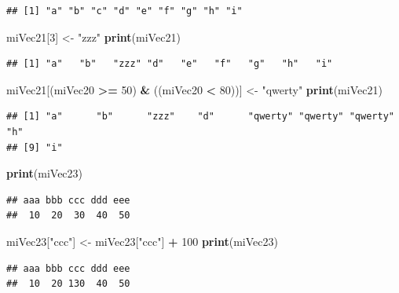 \documentclass[
]{book}
\newenvironment{Shaded}{\begin{snugshade}}{\end{snugshade}}
\newcommand{\DecValTok}[1]{\textcolor[rgb]{0.00,0.00,0.81}{#1}}
\newcommand{\KeywordTok}[1]{\textcolor[rgb]{0.13,0.29,0.53}{\textbf{#1}}}
\newcommand{\NormalTok}[1]{#1}
\newcommand{\OperatorTok}[1]{\textcolor[rgb]{0.81,0.36,0.00}{\textbf{#1}}}
\newcommand{\StringTok}[1]{\textcolor[rgb]{0.31,0.60,0.02}{#1}}
\begin{document}
\begin{verbatim}
## [1] "a" "b" "c" "d" "e" "f" "g" "h" "i"
\end{verbatim}

\begin{Shaded}
\begin{Highlighting}[]
\NormalTok{miVec21[}\DecValTok{3}\NormalTok{] <-}\StringTok{ "zzz"}
\KeywordTok{print}\NormalTok{(miVec21)}
\end{Highlighting}
\end{Shaded}

\begin{verbatim}
## [1] "a"   "b"   "zzz" "d"   "e"   "f"   "g"   "h"   "i"
\end{verbatim}

\begin{Shaded}
\begin{Highlighting}[]
\NormalTok{miVec21[(miVec20 }\OperatorTok{>=}\StringTok{ }\DecValTok{50}\NormalTok{) }\OperatorTok{&}\StringTok{ }\NormalTok{((miVec20 }\OperatorTok{<}\StringTok{ }\DecValTok{80}\NormalTok{))] <-}\StringTok{ "qwerty"}
\KeywordTok{print}\NormalTok{(miVec21)}
\end{Highlighting}
\end{Shaded}

\begin{verbatim}
## [1] "a"      "b"      "zzz"    "d"      "qwerty" "qwerty" "qwerty" "h"     
## [9] "i"
\end{verbatim}

\begin{Shaded}
\begin{Highlighting}[]
\KeywordTok{print}\NormalTok{(miVec23)}
\end{Highlighting}
\end{Shaded}

\begin{verbatim}
## aaa bbb ccc ddd eee 
##  10  20  30  40  50
\end{verbatim}

\begin{Shaded}
\begin{Highlighting}[]
\NormalTok{miVec23[}\StringTok{"ccc"}\NormalTok{] <-}\StringTok{ }\NormalTok{miVec23[}\StringTok{"ccc"}\NormalTok{] }\OperatorTok{+}\StringTok{ }\DecValTok{100}
\KeywordTok{print}\NormalTok{(miVec23)}
\end{Highlighting}
\end{Shaded}

\begin{verbatim}
## aaa bbb ccc ddd eee 
##  10  20 130  40  50
\end{verbatim}
\end{document}
